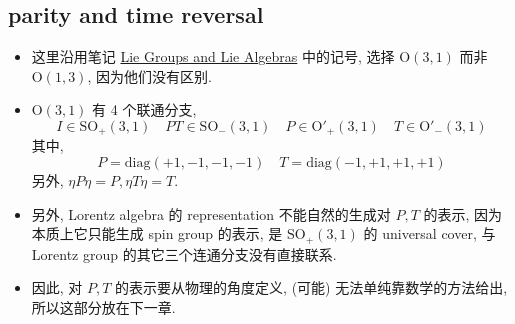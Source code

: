 \subsection{parity and time reversal}
\begin{itemize}
	\item 这里沿用笔记 \href{https://github.com/siyang03/my-note---Lie-Groups-and-Lie-Algebras}{Lie Groups and Lie Algebras} 中的记号, 选择 $\mathrm{O}(3, 1)$ 而非 $\mathrm{O}(1, 3)$, 因为他们没有区别.
	
	\item $\mathrm{O}(3, 1)$ 有 4 个联通分支,
	\begin{equation}
		I \in \mathrm{SO}_+(3, 1) \quad P T \in \mathrm{SO}_-(3, 1) \quad P \in \mathrm{O}'_+(3, 1) \quad T \in \mathrm{O}'_-(3, 1)
	\end{equation}
	其中,
	\begin{equation}
		P = \mathrm{diag}(+ 1, - 1, - 1, - 1) \quad T = \mathrm{diag}(- 1, + 1, + 1, + 1)
	\end{equation}
	另外, $\eta P \eta = P, \eta T \eta = T$.
	
	\item 另外, Lorentz algebra 的 representation 不能自然的生成对 $P, T$ 的表示, 因为本质上它只能生成 spin group 的表示, 是 $\mathrm{SO}_+(3, 1)$ 的 universal cover, 与 Lorentz group 的其它三个连通分支没有直接联系.
	
	\item 因此, 对 $P, T$ 的表示要从物理的角度定义, (可能) 无法单纯靠数学的方法给出, 所以这部分放在下一章.
\end{itemize}
